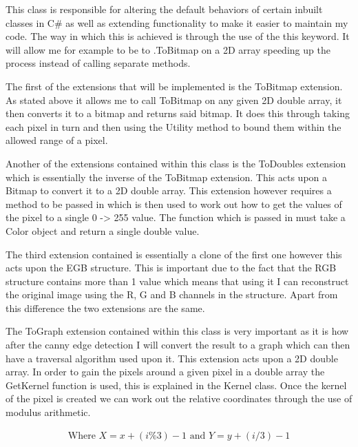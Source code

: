 \begin{FlushLeft}
\begin{enumerate}
    This class is responsible for altering the default behaviors of certain inbuilt classes in C# as well as extending functionality to make it easier to maintain my code. The way in which this is achieved is through the use of the this keyword. It will allow me for example to be to .ToBitmap on a 2D array speeding up the process instead of calling separate methods.\\ \bk

    The first of the extensions that will be implemented is the ToBitmap extension. As stated above it allows me to call ToBitmap on any given 2D double array, it then converts it to a bitmap and returns said bitmap. It does this through taking each pixel in turn and then using the Utility method to bound them within the allowed range of a pixel. \\ \bk

    Another of the extensions contained within this class is the ToDoubles extension which is essentially the inverse of the ToBitmap extension. This acts upon a Bitmap to convert it to a 2D double array. This extension however requires a method to be passed in which is then used to work out how to get the values of the pixel to a single 0 -> 255 value. The function which is passed in must take a Color object and return a single double value. \\ \bk

    The third extension contained is essentially a clone of the first one however this acts upon the EGB structure. This is important due to the fact that the RGB structure contains more than 1 value which means that using it I can reconstruct the original image using the R, G and B channels in the structure. Apart from this difference the two extensions are the same. \\ \bk

    The ToGraph extension contained within this class is very important as it is how after the canny edge detection I will convert the result to a graph which can then have a traversal algorithm used upon it. This extension acts upon a 2D double array. In order to gain the pixels around a given pixel in a double array the GetKernel function is used, this is explained in the Kernel class. Once the kernel of the pixel is created we can work out the relative coordinates through the use of modulus arithmetic.

    \begin{gather*}
        \text{Where } X = x + (i \% 3) -1 \text{ and } Y = y + (i / 3) - 1 \\
    \end{gather*} \\ 


\end{enumerate}
\end{FlushLeft}
